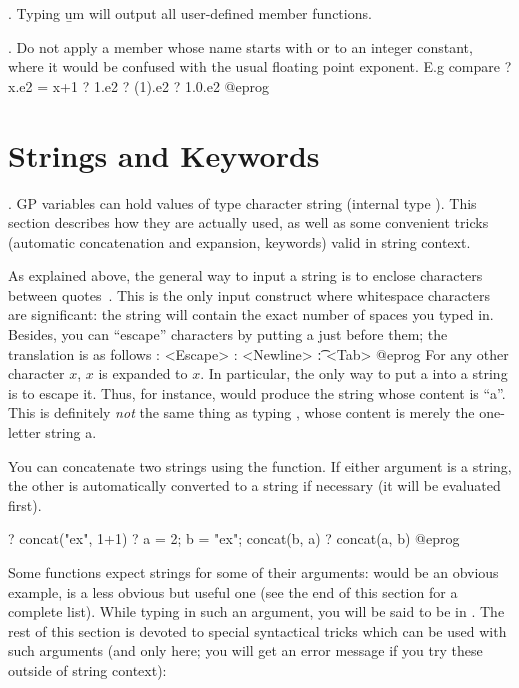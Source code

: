 . Typing \b{um} will output all user-defined member functions.

. Do not apply a member whose name starts with
 or  to an integer constant, where it would be confused with
the usual floating point exponent. E.g compare
\bprog
  ? x.e2 = x+1
  ? 1.e2
  ? (1).e2
  ? 1.0.e2
@eprog

\section{Strings and Keywords}
\label{se:strings}

. GP variables can hold values of type character string
(internal type ). This section describes how they are actually used,
as well as some convenient tricks (automatic concatenation and expansion,
keywords) valid in string context.

As explained above, the general way to input a string is to enclose
characters between quotes~. This is the only input construct where
whitespace characters are significant: the string will contain the exact
number of spaces you typed in. Besides, you can ``escape'' characters by
putting a \kbd{\bs} just before them; the translation is as follows
\bprog
   \e: <Escape>
   \n: <Newline>
   \t: <Tab>
@eprog
For any other character $x$, \b{$x$} is expanded to $x$. In particular, the
only way to put a  into a string is to escape it. Thus, for
instance,  would produce the string whose content is
``a''. This is definitely \emph{not} the same thing as typing ,
whose content is merely the one-letter string a.

You can concatenate two strings using the  function. If either
argument is a string, the other is automatically converted to a string if
necessary (it will be evaluated first).

\bprog
? concat("ex", 1+1)
? a = 2; b = "ex"; concat(b, a)
? concat(a, b)
@eprog

Some functions expect strings for some of their arguments:  would
be an obvious example,  is a less obvious but useful one (see the
end of this section for a complete list). While typing in such an argument,
you will be said to be in . The rest of this section is
devoted to special syntactical tricks which can be used with such arguments
(and only here; you will get an error message if you try these outside of
string context):

